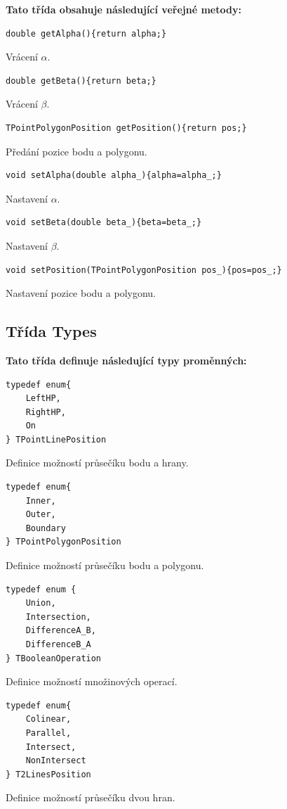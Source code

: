 \documentclass[a4paper, 12pt, oneside, titlepage]{article} %
\begin{document}
\textbf{Tato třída obsahuje následující veřejné metody:}
    
\begin{verbatim}
double getAlpha(){return alpha;}
\end{verbatim}
Vrácení $\alpha$.

\begin{verbatim}
double getBeta(){return beta;}
\end{verbatim}
Vrácení $\beta$.
    
\begin{verbatim}
TPointPolygonPosition getPosition(){return pos;}
\end{verbatim}  
Předání pozice bodu a polygonu.

\begin{verbatim}
void setAlpha(double alpha_){alpha=alpha_;}
\end{verbatim}
Nastavení $\alpha$.

\begin{verbatim}
void setBeta(double beta_){beta=beta_;}
\end{verbatim}
Nastavení $\beta$.

\begin{verbatim}
void setPosition(TPointPolygonPosition pos_){pos=pos_;}
\end{verbatim}
Nastavení pozice bodu a polygonu.

\subsection{Třída Types}
\textbf{Tato třída definuje následující typy proměnných:}
\begin{verbatim}
typedef enum{
    LeftHP,
    RightHP,
    On
} TPointLinePosition
\end{verbatim}
Definice možností průsečíku bodu a hrany.

\begin{verbatim}
typedef enum{
    Inner,
    Outer,
    Boundary
} TPointPolygonPosition
\end{verbatim}
Definice možností průsečíku bodu a polygonu.

\begin{verbatim}
typedef enum {
    Union,
    Intersection,
    DifferenceA_B,
    DifferenceB_A
} TBooleanOperation
\end{verbatim}
Definice možností množinových operací.

\begin{verbatim}
typedef enum{
    Colinear,
    Parallel,
    Intersect,
    NonIntersect
} T2LinesPosition
\end{verbatim}
Definice možností průsečíku dvou hran.
\end{document}
